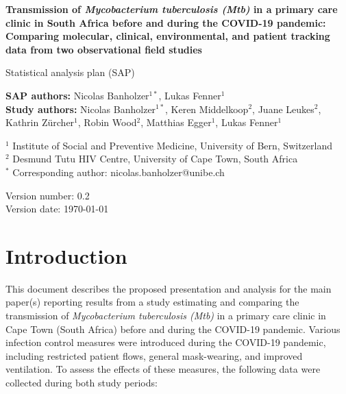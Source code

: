 \documentclass{article}
\begin{document}
\begin{titlepage}
        \vspace*{1cm}
            
        \LARGE
        \textbf{Transmission of \emph{Mycobacterium tuberculosis (\emph{Mtb})} in a primary care clinic in South Africa before and during the COVID-19 pandemic: Comparing molecular, clinical, environmental, and patient tracking data from two observational field studies}
            
        \vspace{0.5cm}
        \Large
        Statistical analysis plan (SAP)
            
        \vspace{1.5cm}
            
        \textbf{SAP authors:} Nicolas Banholzer$^{1*}$, Lukas Fenner$^1$ \\
        \textbf{Study authors:} Nicolas Banholzer$^{1*}$, Keren Middelkoop$^{2}$, Juane Leukes$^{2}$, Kathrin Z\"urcher$^{1}$, Robin Wood$^{2}$, Matthias Egger$^1$, Lukas Fenner$^1$

        \vspace{1cm}

        $^1$ Institute of Social and Preventive Medicine, University of Bern, Switzerland \\
        $^2$ Desmund Tutu HIV Centre, University of Cape Town, South Africa \\
        $^*$ Corresponding author: nicolas.banholzer@unibe.ch
            
        \vfill
            
        \Large
        Version number: 0.2 \\
        Version date: \today 

        \vspace*{1cm}
\end{titlepage}

\tableofcontents

\clearpage

\section{Introduction}

This document describes the proposed presentation and analysis for the main paper(s) reporting results from a study estimating and comparing the transmission of \emph{Mycobacterium tuberculosis (\emph{Mtb})} in a primary care clinic in Cape Town (South Africa) before and during the COVID-19 pandemic. Various infection control measures were introduced during the COVID-19 pandemic, including restricted patient flows, general mask-wearing, and improved ventilation. To assess the effects of these measures, the following data were collected during both study periods:
\end{document}
